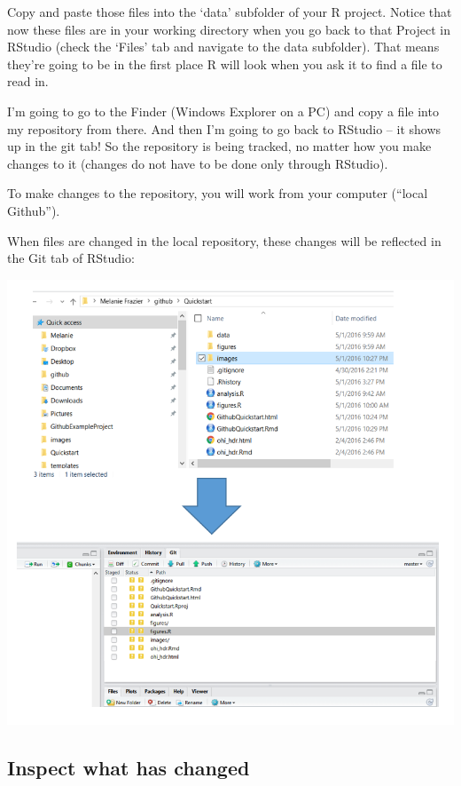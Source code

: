 \documentclass[]{book}
\begin{document}
Copy and paste those files into the `data' subfolder of your R project. Notice that now these files are in your working directory when you go back to that Project in RStudio (check the `Files' tab and navigate to the data subfolder). That means they're going to be in the first place R will look when you ask it to find a file to read in.

I'm going to go to the Finder (Windows Explorer on a PC) and copy a file into my repository from there. And then I'm going to go back to RStudio -- it shows up in the git tab! So the repository is being tracked, no matter how you make changes to it (changes do not have to be done only through RStudio).

To make changes to the repository, you will work from your computer (``local Github'').

When files are changed in the local repository, these changes will be reflected in the Git tab of RStudio:

\includegraphics{img/modify_files.png}

\hypertarget{inspect-what-has-changed}{%
\subsection{Inspect what has changed}\label{inspect-what-has-changed}}
\end{document}
